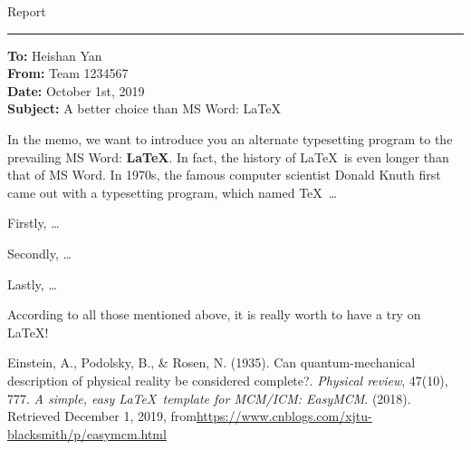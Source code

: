 \documentclass[12pt]{article}  %
\begin{document}
\begin{letter}{Report}
\noindent\rule[0.25\baselineskip]{\textwidth}{2pt} 
\begin{flushleft}  %
\textbf{To:} Heishan Yan\\
\textbf{From:} Team 1234567\\
\textbf{Date:} October 1st, 2019\\
\textbf{Subject:} A better choice than MS Word: \LaTeX
\end{flushleft}

In the memo, we want to introduce you an alternate typesetting program to the prevailing MS Word: \textbf{\LaTeX}. In fact, the history of \LaTeX\ is even longer than that of MS Word. In 1970s, the famous computer scientist Donald Knuth first came out with a typesetting program, which named \TeX\ \ldots

Firstly, \ldots

Secondly, \ldots

Lastly, \ldots

According to all those mentioned above, it is really worth to have a try on \LaTeX! 
\end{letter}


\begin{thebibliography}{99}
 Einstein, A., Podolsky, B., \& Rosen, N. (1935). Can quantum-mechanical description of physical reality be considered complete?. \emph{Physical review}, 47(10), 777.
 \emph{A simple, easy \LaTeX\ template for MCM/ICM: EasyMCM}. (2018). Retrieved December 1, 2019, from\url{https://www.cnblogs.com/xjtu-blacksmith/p/easymcm.html}
\end{thebibliography}
\end{document}
